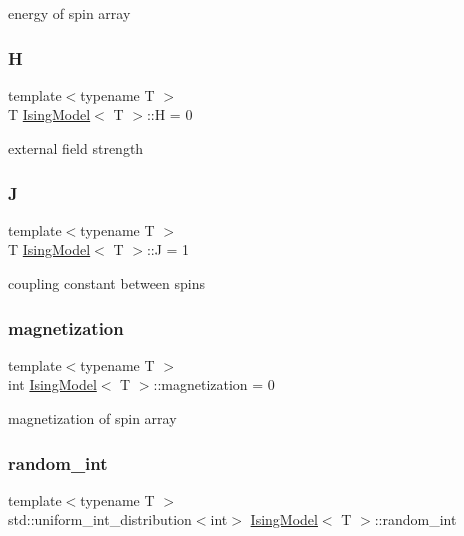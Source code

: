 energy of spin array \mbox{\label{classIsingModel_a19e1a223476c953a9964532c7f0eb6dd}} 
\subsubsection{\texorpdfstring{H}{H}}
{\footnotesize\ttfamily template$<$typename T $>$ \\
T \mbox{\hyperlink{classIsingModel}{Ising\+Model}}$<$ T $>$\+::H = 0\hspace{0.3cm}{\ttfamily [private]}}

external field strength \mbox{\label{classIsingModel_af0c6d48208741fe5a378e29b7fac0da1}} 
\subsubsection{\texorpdfstring{J}{J}}
{\footnotesize\ttfamily template$<$typename T $>$ \\
T \mbox{\hyperlink{classIsingModel}{Ising\+Model}}$<$ T $>$\+::J = 1\hspace{0.3cm}{\ttfamily [private]}}

coupling constant between spins \mbox{\label{classIsingModel_a20c8183929e5e2a395cb962501122e65}} 
\subsubsection{\texorpdfstring{magnetization}{magnetization}}
{\footnotesize\ttfamily template$<$typename T $>$ \\
int \mbox{\hyperlink{classIsingModel}{Ising\+Model}}$<$ T $>$\+::magnetization = 0\hspace{0.3cm}{\ttfamily [private]}}

magnetization of spin array \mbox{\label{classIsingModel_a5f412d0560c599a350d0c266125427c9}} 
\subsubsection{\texorpdfstring{random\+\_\+int}{random\_int}}
{\footnotesize\ttfamily template$<$typename T $>$ \\
std\+::uniform\+\_\+int\+\_\+distribution$<$int$>$ \mbox{\hyperlink{classIsingModel}{Ising\+Model}}$<$ T $>$\+::random\+\_\+int\hspace{0.3cm}{\ttfamily [private]}}

